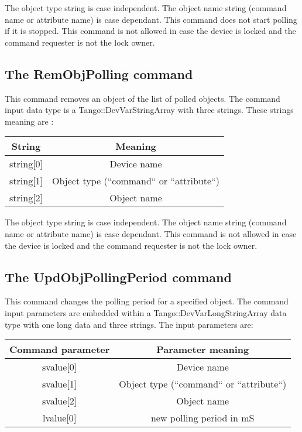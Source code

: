 The object type string is case independent. The object name string
(command name or attribute name) is case dependant. This command does
not start polling if it is stopped. This command is not allowed in
case the device is locked and the command requester is not the lock
owner.

\subsection{The RemObjPolling command}

This command removes an object of the list of polled objects. The
command input data type is a Tango::DevVarStringArray with three strings.
These strings meaning are :

\vspace{0.3cm}

\begin{center}
\begin{longtable}{|c|c|}
\hline 
String & Meaning\tabularnewline
\hline 
\hline 
string{[}0{]} & Device name\tabularnewline
\hline 
string{[}1{]} & Object type (``command`` or ``attribute``)\tabularnewline
\hline 
string{[}2{]} & Object name\tabularnewline
\hline 
\end{longtable}
\par\end{center}

\vspace{0.3cm}

The object type string is case independent. The object name string
(command name or attribute name) is case dependant. This command is
not allowed in case the device is locked and the command requester
is not the lock owner.

\subsection{The UpdObjPollingPeriod command}

This command changes the polling period for a specified object. The
command input parameters are embedded within a Tango::DevVarLongStringArray
data type with one long data and three strings. The input parameters
are:

\vspace{0.3cm}

\begin{center}
\begin{longtable}{|c|c|}
\hline 
Command parameter & Parameter meaning\tabularnewline
\hline 
\hline 
svalue{[}0{]} & Device name\tabularnewline
\hline 
svalue{[}1{]} & Object type (``command`` or ``attribute``)\tabularnewline
\hline 
svalue{[}2{]} & Object name\tabularnewline
\hline 
lvalue{[}0{]} & new polling period in mS\tabularnewline
\hline 
\end{longtable}
\par\end{center}

